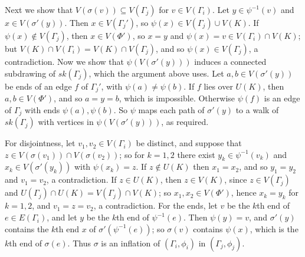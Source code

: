 {Next we show that $V(\sigma(v)) \subseteq V(\Gamma_j)$ for $v \in V(\Gamma_i)$. Let $y \in \psi^{-1}(v)$ and $x \in V(\sigma'(y))$. Then $x \in V(\Gamma_j')$, so $\psi(x) \in V(\Gamma_j) \cup V(K)$. If $\psi(x) \notin V(\Gamma_j)$, then $x \in V(\Phi')$, so $x = y$ and $\psi(x) = v \in V(\Gamma_i) \cap V(K)$; but $V(K) \cap V(\Gamma_i) = V(K) \cap V(\Gamma_j)$, and so $\psi(x) \in V(\Gamma_j)$, a contradiction. Now we show that $\psi(V(\sigma'(y)))$ induces a connected subdrawing of $sk(\Gamma_j)$, which the argument above uses. Let $a, b \in V(\sigma'(y))$ be ends of an edge $f$ of $\Gamma_j'$, with $\psi(a) \ne \psi(b)$. If $f$ lies over $U(K)$, then $a, b \in V(\Phi')$, and so $a = y = b$, which is impossible. Otherwise $\psi(f)$ is an edge of $\Gamma_j$ with ends $\psi(a), \psi(b)$. So $\psi$ maps each path of $\sigma'(y)$ to a walk of $sk(\Gamma_j)$ with vertices in $\psi(V(\sigma'(y)))$, as required.

For disjointness, let $v_1, v_2 \in V(\Gamma_i)$ be distinct, and suppose that $z \in V(\sigma(v_1)) \cap V(\sigma(v_2))$; so for $k = 1, 2$ there exist $y_k \in \psi^{-1}(v_k)$ and $x_k \in V(\sigma'(y_k))$ with $\psi(x_k) = z$. If $z \notin U(K)$ then $x_1 = x_2$, and so $y_1 = y_2$ and $v_1 = v_2$, a contradiction. If $z \in U(K)$, then $z \in V(K)$, since $z \in V(\Gamma_j)$ and $U(\Gamma_j) \cap U(K) = V(\Gamma_j) \cap V(K)$; so $x_1, x_2 \in V(\Phi')$, hence $x_k = y_k$ for $k = 1, 2$, and $v_1 = z = v_2$, a contradiction. For the ends, let $v$ be the $k$th end of $e \in E(\Gamma_i)$, and let $y$ be the $k$th end of $\psi^{-1}(e)$. Then $\psi(y) = v$, and $\sigma'(y)$ contains the $k$th end $x$ of $\sigma'(\psi^{-1}(e))$; so $\sigma(v)$ contains $\psi(x)$, which is the $k$th end of $\sigma(e)$. Thus $\sigma$ is an inflation of $(\Gamma_i, \phi_i)$ in $(\Gamma_j, \phi_j)$.

}
